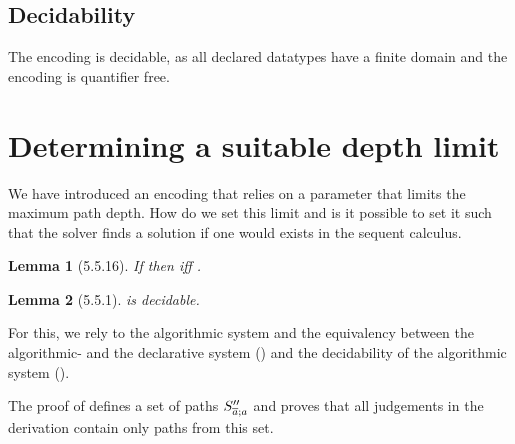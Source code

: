\documentclass[a4paper]{article}
\newtheorem{lemma}{Lemma}
\begin{document}
\subsection{Decidability}
The encoding is decidable,
as all declared datatypes have a finite domain
and the encoding is quantifier free.

\section{Determining a suitable depth limit}
\label{sec:determine-depth-limit}
We have introduced an encoding that relies on a parameter
that limits the maximum path depth.
How do we set this limit and is it possible to set it such
that the solver finds a solution if one would exists in the sequent calculus.

\begin{lemma}[5.5.16]
  \label{lem:constraint-system-equiv}
  If  then  iff .
\end{lemma}

\begin{lemma}[5.5.1]
  \label{lem:algorithmic-system-decidable}
   is decidable.
\end{lemma}

For this, we rely to the algorithmic system and the equivalency
between the algorithmic- and the declarative system ()
and the decidability of the algorithmic system ().

The proof of 
defines a set of paths $S''_{\overline{a};a}$ and proves that
all judgements in the derivation contain only paths from this set.
\end{document}
